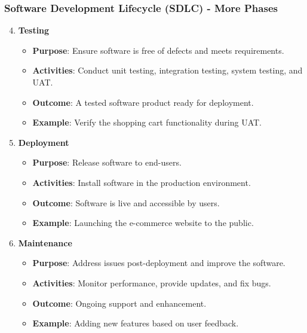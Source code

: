 \documentclass{beamer}
\begin{document}
\begin{frame}[fragile]
    \frametitle{Software Development Lifecycle (SDLC) - More Phases}
    \begin{enumerate}
        \setcounter{enumi}{3} %
        \item \textbf{Testing}
            \begin{itemize}
                \item \textbf{Purpose}: Ensure software is free of defects and meets requirements.
                \item \textbf{Activities}: Conduct unit testing, integration testing, system testing, and UAT.
                \item \textbf{Outcome}: A tested software product ready for deployment.
                \item \textbf{Example}: Verify the shopping cart functionality during UAT.
            \end{itemize}
        
        \item \textbf{Deployment}
            \begin{itemize}
                \item \textbf{Purpose}: Release software to end-users.
                \item \textbf{Activities}: Install software in the production environment.
                \item \textbf{Outcome}: Software is live and accessible by users.
                \item \textbf{Example}: Launching the e-commerce website to the public.
            \end{itemize}

        \item \textbf{Maintenance}
            \begin{itemize}
                \item \textbf{Purpose}: Address issues post-deployment and improve the software.
                \item \textbf{Activities}: Monitor performance, provide updates, and fix bugs.
                \item \textbf{Outcome}: Ongoing support and enhancement.
                \item \textbf{Example}: Adding new features based on user feedback.
            \end{itemize}
    \end{enumerate}
\end{frame}
\end{document}
